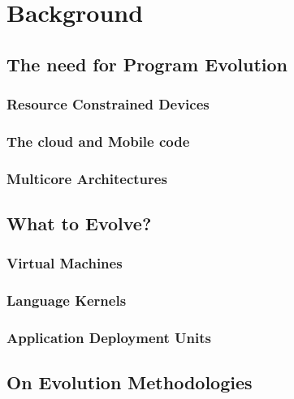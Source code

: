 
\chapter{Background}
\minitoc
\introduction
	
	
\newpage
\section{The need for Program Evolution}

\subsection{Resource Constrained Devices}

\subsection{The cloud and Mobile code}

\subsection{Multicore Architectures}

\section{What to Evolve?}

\subsection{Virtual Machines}

\subsection{Language Kernels}

\subsection{Application Deployment Units}

\section{On Evolution Methodologies}

